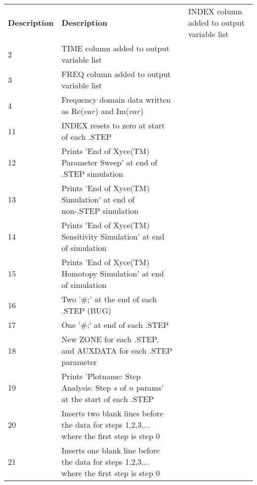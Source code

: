 {
\renewcommand{\arraystretch}{1.2}
\begin{longtable}{>{\ttfamily\small}m{1in}<{\normalfont\small}>{\ttfamily\small}m{3.75in}@{}}
  \color{white}\normalfont\bf Description & 
  \endfirsthead
  \color{white}\normalfont\bf Description & 
   & INDEX column added to output variable list \\
2 & TIME column added to output variable list \\
3 & FREQ column added to output variable list \\
4 & Frequency domain data written as Re($var$) and Im($var$) \\
11 & INDEX resets to zero at start of each .STEP \\
12 & Prints 'End of Xyce(TM) Parameter Sweep' at end of .STEP simulation \\
13 & Prints 'End of Xyce(TM) Simulation' at end of non-.STEP simulation \\
14 & Prints 'End of Xyce(TM) Sensitivity Simulation' at end of simulation \\
15 & Prints 'End of Xyce(TM) Homotopy Simulation' at end of simulation \\
16 & Two '\#;' at the end of each .STEP (BUG) \\
17 & One '\#;' at end of each .STEP \\
18 & New ZONE for each .STEP, and AUXDATA for each .STEP parameter \\
19 & Prints 'Plotname: Step Analysis: Step $s$ of $n$ params' at the start of each .STEP \\
20 & Inserts two blank lines before the data for steps 1,2,3,... where 
     the first step is step 0 \\
21 & Inserts one blank line before the data for steps 1,2,3,... where
     the first step is step 0 \\
\end{longtable}
}


